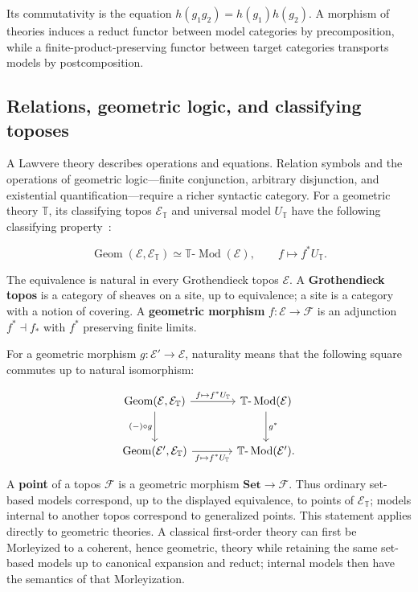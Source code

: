 \documentclass[11pt]{article}
\begin{document}
Its commutativity is the equation \(h(g_1g_2)=h(g_1)h(g_2)\). A morphism
of theories induces a reduct functor between model categories by
precomposition, while a finite-product-preserving functor between target
categories transports models by postcomposition.

\subsection{Relations, geometric logic, and classifying toposes}

A Lawvere theory describes operations and equations. Relation symbols and the
operations of geometric logic---finite conjunction, arbitrary disjunction,
and existential quantification---require a richer syntactic category. For a
geometric theory \(\mathbb T\), its classifying topos
\(\mathcal E_{\mathbb T}\) and universal model \(U_{\mathbb T}\) have the
following classifying property~\cite[pp.~3--5]{CaramelloClassifying}:

\[
\operatorname{Geom}(\mathcal E,\mathcal E_{\mathbb T})
\simeq
\mathbb T\text{-}\operatorname{Mod}(\mathcal E),
\qquad f\longmapsto f^*U_{\mathbb T}.
\]

The equivalence is natural in every Grothendieck topos \(\mathcal E\). A
\textbf{Grothendieck topos} is a category of sheaves on a site, up to
equivalence; a site is a category with a notion of covering. A
\textbf{geometric morphism} \(f:\mathcal E\to\mathcal F\) is an adjunction
\(f^*\dashv f_*\) with \(f^*\) preserving finite limits.

For a geometric morphism
\(g:\mathcal E'\to\mathcal E\), naturality means that the following square
commutes up to natural isomorphism:

\[
\begin{tikzcd}[row sep=large,column sep=large]
\operatorname{Geom}(\mathcal E,\mathcal E_{\mathbb T})
  \arrow[r,"f\mapsto f^*U_{\mathbb T}"]
  \arrow[d,"(-)\circ g"'] &
\mathbb T\text{-}\operatorname{Mod}(\mathcal E)
  \arrow[d,"g^*"] \\
\operatorname{Geom}(\mathcal E',\mathcal E_{\mathbb T})
  \arrow[r,"f\mapsto f^*U_{\mathbb T}"'] &
\mathbb T\text{-}\operatorname{Mod}(\mathcal E').
\end{tikzcd}
\]

A \textbf{point} of
a topos \(\mathcal F\) is a geometric morphism
\(\mathbf{Set}\to\mathcal F\). Thus ordinary set-based models correspond,
up to the displayed equivalence, to points of \(\mathcal E_{\mathbb T}\);
models internal to another topos correspond to generalized points. This
statement applies directly to geometric theories. A classical first-order
theory can first be Morleyized to a coherent, hence geometric, theory while
retaining the same set-based models up to canonical expansion and reduct;
internal models then have the semantics of that Morleyization.
\end{document}
